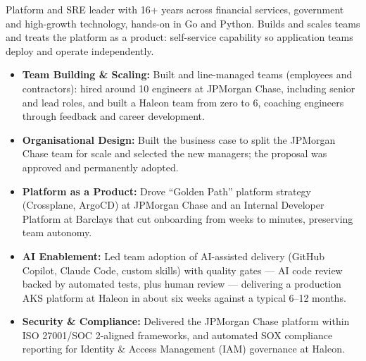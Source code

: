 
\begin{cvparagraph}
      Platform and SRE leader with 16+ years across financial services, government and high-growth technology,
      hands-on in Go and Python. Builds and scales teams and treats the platform as a product: self-service
      capability so application teams deploy and operate independently.

      \begin{itemize}[nosep]
            \item \textbf{Team Building \& Scaling:} Built and line-managed teams (employees and contractors): hired around 10 engineers
                  at JPMorgan Chase, including senior and lead roles, and built a Haleon team from zero to 6, coaching engineers
                  through feedback and career development.
            \item \textbf{Organisational Design:} Built the business case to split the JPMorgan Chase team for scale and selected the new
                  managers; the proposal was approved and permanently adopted.
            \item \textbf{Platform as a Product:} Drove ``Golden Path'' platform strategy (Crossplane, ArgoCD) at JPMorgan Chase and an
                  Internal Developer Platform at Barclays that cut onboarding from weeks to minutes, preserving team autonomy.
            \item \textbf{AI Enablement:} Led team adoption of AI-assisted delivery (GitHub Copilot, Claude Code, custom skills)
                  with quality gates --- AI code review backed by automated tests, plus human review --- delivering a production
                  AKS platform at Haleon in about six weeks against a typical 6--12 months.
            \item \textbf{Security \& Compliance:} Delivered the JPMorgan Chase platform within ISO 27001/SOC 2-aligned frameworks,
                  and automated SOX compliance reporting for Identity \& Access Management (IAM) governance at Haleon.
      \end{itemize}
\end{cvparagraph}
